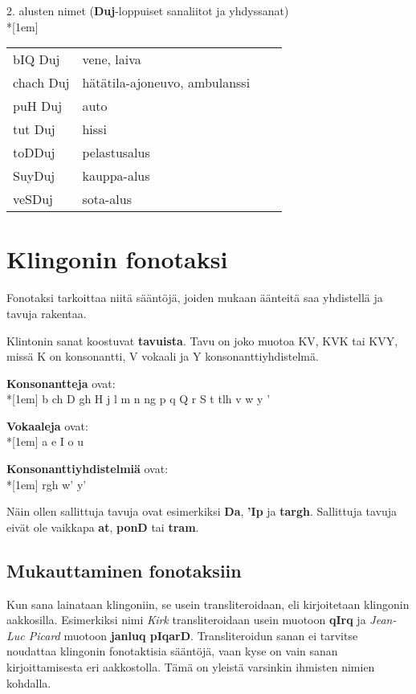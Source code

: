 \documentclass{book}
\begin{document}
2. alusten nimet (\textbf{Duj}-loppuiset sanaliitot ja yhdyssanat)\\*[1em]
\begin{tabular}{Bl Il}
    bIQ Duj & vene, laiva \\
    chach Duj & hätätila-ajoneuvo, ambulanssi \\
    puH Duj & auto \\
    tut Duj & hissi \\
    toDDuj & pelastusalus \\
    SuyDuj & kauppa-alus \\
    veSDuj & sota-alus \\
\end{tabular}

\chapter{Klingonin fonotaksi}
\label{apx:fonotaksi}

Fonotaksi tarkoittaa niitä sääntöjä, joiden mukaan äänteitä saa yhdistellä ja tavuja rakentaa.

Klintonin sanat koostuvat \textbf{tavuista}.
Tavu on joko muotoa KV, KVK tai KVY, missä K on konsonantti, V vokaali ja Y konsonanttiyhdistelmä.

\textbf{Konsonantteja} ovat:\\*[1em]
b ch D gh H j l m n ng p q Q r S t tlh v w y '

\textbf{Vokaaleja} ovat:\\*[1em]
a e I o u

\textbf{Konsonanttiyhdistelmiä} ovat:\\*[1em]
rgh w' y'

Näin ollen sallittuja tavuja ovat esimerkiksi \textbf{Da}, \textbf{'Ip} ja \textbf{targh}. Sallittuja tavuja eivät ole vaikkapa \textbf{at}, \textbf{ponD} tai \textbf{tram}.

\section{Mukauttaminen fonotaksiin}

Kun sana lainataan klingoniin, se usein transliteroidaan, eli kirjoitetaan klingonin aakkosilla. Esimerkiksi nimi \textit{Kirk} transliteroidaan usein muotoon \textbf{qIrq} ja \textit{Jean-Luc Picard} muotoon \textbf{janluq pIqarD}. Transliteroidun sanan ei tarvitse noudattaa klingonin fonotaktisia sääntöjä, vaan kyse on vain sanan kirjoittamisesta eri aakkostolla. Tämä on yleistä varsinkin ihmisten nimien kohdalla.
\end{document}
